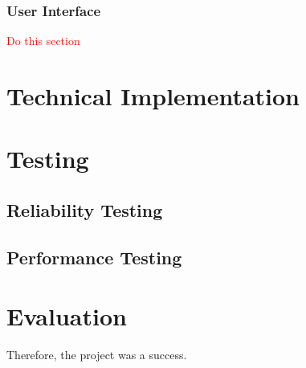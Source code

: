 \documentclass[11pt,twoside,a4paper]{article}
\begin{document}
\subsubsection{User Interface}
\textcolor{red}{Do this section}
\section{Technical Implementation}
\section{Testing}
\subsection{Reliability Testing}
\subsection{Performance Testing}
\section{Evaluation}
Therefore, the project was a success.
\newpage
\printbibliography
\label{end}
\end{document}
